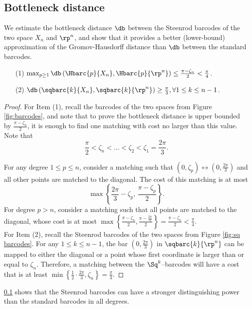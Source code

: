 \subsection{Bottleneck distance}\label{prop:db estimate}

We estimate the bottleneck distance $\db$ between the Steenrod barcodes of the two space $X_n$ and $\rp^n$, and show that it provides a better (lower-bound) approximation of the Gromov-Hausdorff distance than $\db$ between the standard barcodes.

\medskip\theorem
\begin{itemize}
	\item[(1)] $\max_{p\geq 1}\db\left(\Hbarc{p}{X_n}, \Hbarc{p}{\rp^n}\right)\leq \frac{\pi-\zeta_n}{2}<\frac{\pi}{4}$.
	\smallskip\item[(2)] $\db\left(\sqbarc{k}{X_n}, \sqbarc{k}{\rp^n}\right)\geq \frac{\pi}{3},\forall 1\leq k\leq n-1$.
\end{itemize}

\begin{proof}
	For Item (1), recall the barcodes of the two spaces from Figure \ref{fig:barcodes}, and note that to prove the bottleneck distance is upper bounded by $\frac{\pi-\zeta_n}{2}$, it is enough to find one matching with cost no larger than this value.
	Note that
	\[
	\frac{\pi}{2}<\zeta_n<\dots<\zeta_2<\zeta_1 =\frac{2\pi}{3}.
	\]
	
	For any degree $1\leq p\leq n$, consider a matching such that $(0,\zeta_p)\leftrightarrow \left(0,\frac{2\pi}{3}\right)$ and all other points are matched to the diagonal.
	The cost of this matching is at most
	\[
	\max\left\{\frac{2\pi}{3}-\zeta_p,\,\frac{\pi-\zeta_p}{2}\right\}.
	\]
	For degree $p>n$, consider a matching such that all points are matched to the diagonal, whose cost is at most $\max\left\{ \frac{\pi-\zeta_n}{2}, \frac{\pi-\frac{2\pi}{3}}{2}\right\} = \frac{\pi-\zeta_n}{2}<\frac{\pi}{4}.$ \\
	
	For Item (2), recall the Steenrod barcodes of the two spaces from Figure \ref{fig:sq barcodes}.
	For any $1\leq k\leq n-1$, the bar $\left(0,\frac{2\pi}{3}\right)$ in $\sqbarc{k}{\rp^n}$ can be mapped to either the diagonal or a point whose first coordinate is larger than or equal to $\zeta_n$.
	Therefore, a matching between the $\Sq^k$--barcodes will have a cost that is at least $\min\left\{\frac{1}{2}\cdot\frac{2\pi}{3}, \zeta_n\right\} = \frac{\pi}{3}.$
\end{proof}

\cref{prop:db estimate} shows that the Steenrod barcodes can have a stronger distinguishing power than the standard barcodes in all degrees.